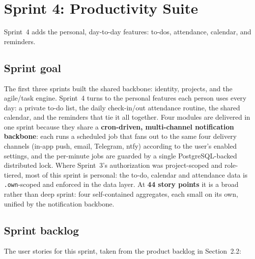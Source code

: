 
\clearpage
\section{Sprint 4: Productivity Suite}

Sprint~4 adds the personal, day-to-day features: to-dos, attendance, calendar, and reminders.

\subsection{Sprint goal}

The first three sprints built the shared backbone: identity, projects, and the agile/task
engine. Sprint~4 turns to the personal features each person uses every day: a private
to-do list, the daily check-in/out attendance routine, the shared calendar, and the reminders
that tie it all together. Four modules are delivered in one sprint because they share a
\textbf{cron-driven, multi-channel notification backbone}: each runs a scheduled job that fans
out to the same four delivery channels (in-app push, email, Telegram, ntfy) according to the
user's enabled settings, and the per-minute jobs are guarded by a single PostgreSQL-backed
distributed lock. Where Sprint~3's authorization was project-scoped and role-tiered, most of
this sprint is personal: the to-do, calendar and attendance data is \texttt{.own}-scoped and
enforced in the data layer. At \textbf{44 story points} it is a broad rather than deep sprint:
four self-contained aggregates, each small on its own, unified by the notification backbone.

\subsection{Sprint backlog}

The user stories for this sprint, taken from the product backlog in Section~2.2:

